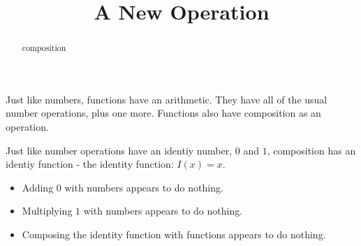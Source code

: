 \documentclass{ximera}
\title{A New Operation}
\begin{document}
\begin{abstract}
composition
\end{abstract}
\maketitle









Just like numbers, functions have an arithmetic.  They have all of the usual number operations, plus one more.  Functions also have composition as an operation.

Just like number operations have an identiy number, $0$ and $1$, composition has an identiy function - the identity function: $I(x) = x$.


\begin{itemize}
\item Adding $0$ with numbers appears to do nothing.
\item Multiplying $1$ with numbers appears to do nothing.
\item Composing the identity function with functions appears to do nothing.
\end{itemize}
\end{document}
